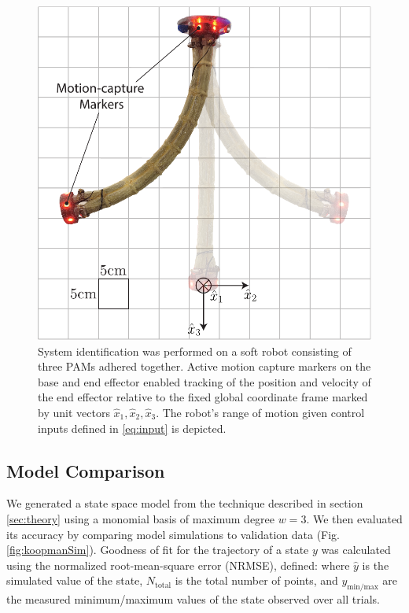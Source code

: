 \begin{figure}
    \centering
    \vspace{10pt}
    \includegraphics[width=0.95\linewidth]{figures/flaccyDiagram_bothways_v4.pdf}
    \caption{System identification was performed on a soft robot consisting of three PAMs adhered together. 
        Active motion capture markers on the base and end effector enabled tracking of the position and velocity of the end effector relative to the fixed global coordinate frame marked by unit vectors $\hat{x}_1,\hat{x}_2,\hat{x}_3$. The robot's range of motion given control inputs defined in \eqref{eq:input} is depicted.}
    \label{fig:flaccy}
\end{figure}


\subsection{Model Comparison}
\label{sec:modelcomparison}

We generated a state space model from the technique described in section \ref{sec:theory} using a monomial basis of maximum degree $w=3$.
We then evaluated its accuracy by comparing model simulations to validation data (Fig. \ref{fig:koopmanSim}).
Goodness of fit for the trajectory of a state $y$ was calculated using the normalized root-mean-square error (NRMSE), defined:
where $\hat{y}$ is the simulated value of the state, $N_\text{total}$ is the total number of points, and $y_{\text{min/max}}$ are the measured minimum/maximum values of the state observed over all trials.


